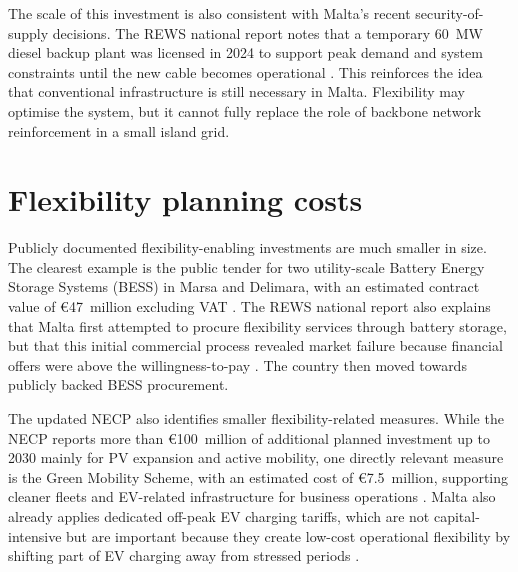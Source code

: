 \documentclass[10pt, a4paper, twoside, twocolumn]{book}
\begin{document}
\begin{table}[h]
    \centering
    \caption{Technical parameters for the second electricity interconnector. Source: ICM \cite{ewa_necp_2025}}
\end{table}

The scale of this investment is also consistent with Malta's recent security-of-supply decisions. The REWS national report notes that a temporary 60~MW diesel backup plant was licensed in 2024 to support peak demand and system constraints until the new cable becomes operational \cite{rews_nationalreport_2025}. This reinforces the idea that conventional infrastructure is still necessary in Malta. Flexibility may optimise the system, but it cannot fully replace the role of backbone network reinforcement in a small island grid.

\section{Flexibility planning costs}

Publicly documented flexibility-enabling investments are much smaller in size. The clearest example is the public tender for two utility-scale Battery Energy Storage Systems (BESS) in Marsa and Delimara, with an estimated contract value of \euro47~million excluding VAT \cite{eu_bess_tender_2024}. The REWS national report also explains that Malta first attempted to procure flexibility services through battery storage, but that this initial commercial process revealed market failure because financial offers were above the willingness-to-pay \cite{rews_nationalreport_2025}. The country then moved towards publicly backed BESS procurement.

The updated NECP also identifies smaller flexibility-related measures. While the NECP reports more than \euro100~million of additional planned investment up to 2030 mainly for PV expansion and active mobility, one directly relevant measure is the Green Mobility Scheme, with an estimated cost of \euro7.5~million, supporting cleaner fleets and EV-related infrastructure for business operations \cite{ewa_necp_2025}. Malta also already applies dedicated off-peak EV charging tariffs, which are not capital-intensive but are important because they create low-cost operational flexibility by shifting part of EV charging away from stressed periods \cite{rews_tariffs_2025}.
\end{document}
